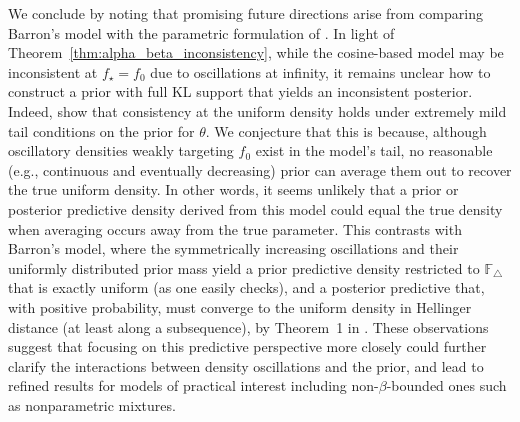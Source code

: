 \documentclass[11pt,twoside]{article}
\def\FF{\mathbb{F}}
\def\FF{\mathbb{F}}
\begin{document}
We conclude by noting that promising future directions arise from comparing Barron’s model with the parametric formulation of \cite{bariletto2025identifiability}. In light of Theorem~\ref{thm:alpha_beta_inconsistency}, while the cosine-based model may be inconsistent at $f_\star=f_0$ due to oscillations at infinity, it remains unclear how to construct a prior with full KL support that yields an inconsistent posterior. Indeed, \cite{bariletto2025identifiability} show that consistency at the uniform density holds under extremely mild tail conditions on the prior for $\theta$. We conjecture that this is because, although oscillatory densities weakly targeting $f_0$ exist in the model’s tail, no reasonable (e.g., continuous and eventually decreasing) prior can average them out to recover the true uniform density. In other words, it seems unlikely that a prior or posterior predictive density derived from this model could equal the true density when averaging occurs away from the true parameter. This contrasts with Barron’s model, where the symmetrically increasing oscillations and their uniformly distributed prior mass yield a prior predictive density restricted to $\FF_\triangle$ that is exactly uniform (as one easily checks), and a posterior predictive that, with positive probability, must converge to the uniform density in Hellinger distance (at least along a subsequence), by Theorem~1 in \cite{walker2004newapproaches}. These observations suggest that focusing on this predictive perspective more closely could further clarify the interactions between density oscillations and the prior, and lead to refined results for models of practical interest including non-$\beta$-bounded ones such as nonparametric mixtures.









\end{document}
